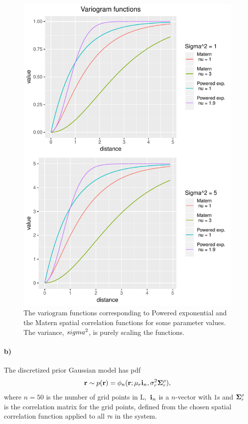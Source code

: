 \begin{figure}
    \centering
    \includegraphics{figures/variograms.pdf}
    \caption{The variogram functions corresponding to Powered exponential and the Matern spatial correlation functions for some parameter values. The variance, $\\sigma^2$, is purely scaling the functions.}
    \label{fig:variograms}
\end{figure}





\paragraph{b)}
The discretized prior Gaussian model has pdf
\begin{equation}
    \boldsymbol{\mathbf{r}} \sim p(\boldsymbol{\mathbf{r}}) = \phi_n(\boldsymbol{\mathbf{r}}; \mu_r \boldsymbol{\mathbf{i}}_n, \sigma_r^2\boldsymbol{\mathbf{\Sigma}}_r^{\rho}),
\end{equation}
where $n = 50$ is the number of grid points in $\text{L},$ $\boldsymbol{\mathbf{i}}_n$ is a $n$-vector with $1$s and $\boldsymbol{\mathbf{\Sigma}}_r^{\rho}$ is the correlation matrix for the grid points, defined from the chosen spatial correlation function applied to all $\tau$s in the system.

